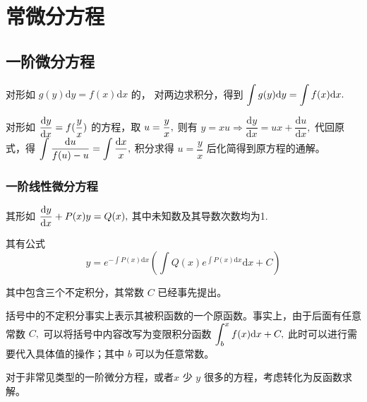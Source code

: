 \chapter{常微分方程}

\section{一阶微分方程}


对形如 $ g(y)\mathrm{d}y = f(x)\mathrm{d}x $ 的，
对两边求积分，得到 $ \displaystyle \int g(y) \mathrm{d}y = \int f(x)\mathrm{d}x. $ 


对形如 $ \displaystyle \dfrac{\mathrm{d}y}{\mathrm{d}x} = f(\dfrac{y}{x}) $ 的方程，取
$ \displaystyle u = \dfrac{y}{x}, $ 则有 $ y = xu \Rightarrow \dfrac{\mathrm{d}y}{\mathrm{d}x}
= ux + \dfrac{\mathrm{d}u}{\mathrm{d}x}, $ 代回原式，得
$ \displaystyle \int \dfrac{\mathrm{d}u}{f(u) - u} = \int \dfrac{\mathrm{d}x}{x}, $ 
积分求得 $ u = \dfrac{y}{x} $ 后化简得到原方程的通解。

\subsection{一阶线性微分方程}

其形如 $ \displaystyle \dfrac{\mathrm{d}y}{\mathrm{d}x} + P(x)y = Q(x), $ 其中未知数及其导数次数均为1.

其有公式$$
    y = e^{-\int P(x)\mathrm{d}x}
    \left(\int Q(x)e^{\int P(x)\mathrm{d}x}\mathrm{d}x+C\right)
$$ 

其中包含三个不定积分，其常数 $ C $ 已经事先提出。

括号中的不定积分事实上表示其被积函数的一个原函数。事实上，由于后面有任意常数 $ C, $ 
可以将括号中内容改写为变限积分函数 $ \displaystyle \int_b^x f(x)\mathrm{d}x + C, $ 
此时可以进行需要代入具体值的操作；其中 $ b $ 可以为任意常数。

对于非常见类型的一阶微分方程，或者$ x $ 少 $ y $ 很多的方程，考虑转化为反函数求解。

